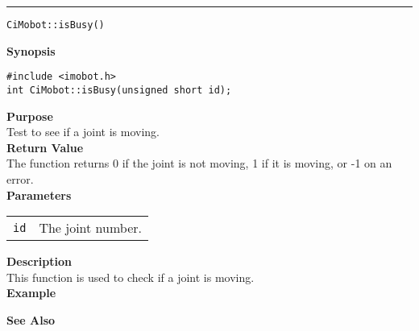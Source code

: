 \noindent
\vspace{5pt}
\rule{6.5in}{0.015in}
\noindent
{\LARGE \texttt{CiMobot::isBusy()}}\\
{}

\noindent
{\bf Synopsis}\\
\begin{verbatim}
#include <imobot.h>
int CiMobot::isBusy(unsigned short id);
\end{verbatim}

\noindent
{\bf Purpose}\\
Test to see if a joint is moving.\\

\noindent
{\bf Return Value}\\
The function returns 0 if the joint is not moving, 1 if it is moving, or -1 on an error.\\

\noindent
{\bf Parameters}
\vspace{-0.1in}
\begin{description}
\item               
\begin{tabular}{p{10 mm}p{145 mm}}
\texttt{id} & The joint number. \\
\end{tabular}
\end{description}

\noindent
{\bf Description}\\
This function is used to check if a joint is moving.\\

\noindent
{\bf Example}\\
\noindent

\noindent
{\bf See Also}\\

